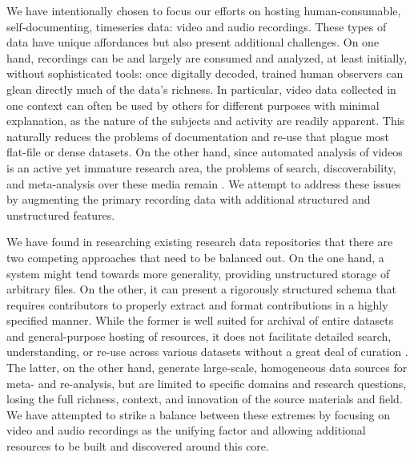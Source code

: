\documentclass{sig-alternate}
\begin{document}
We have intentionally chosen to focus our efforts on hosting human-consumable, self-documenting, timeseries data: video and audio recordings.
These types of data have unique affordances but also present additional challenges.
On one hand, recordings can be and largely are consumed and analyzed, at least initially, without sophisticated tools: once digitally decoded, trained human observers can glean directly much of the data's richness.
In particular, video data collected in one context can often be used by others for different purposes with minimal explanation, as the nature of the subjects and activity are readily apparent.
This naturally reduces the problems of documentation and re-use that plague most flat-file or dense datasets.
On the other hand, since automated analysis of videos is an active yet immature research area, the problems of search, discoverability, and meta-analysis over these media remain \cite{Albertson_2013}.
We attempt to address these issues by augmenting the primary recording data with additional structured and unstructured features.


We have found in researching existing research data repositories that there are two competing approaches that need to be balanced out.
On the one hand, a system might tend towards more generality, providing unstructured storage of arbitrary files.
On the other, it can present a rigorously structured schema that requires contributors to properly extract and format contributions in a highly specified manner.
While the former is well suited for archival of entire datasets and general-purpose hosting of resources, it does not facilitate detailed search, understanding, or re-use across various datasets without a great deal of curation \cite{Peer_2012}.
The latter, on the other hand, generate large-scale, homogeneous data sources for meta- and re-analysis, but are limited to specific domains and research questions, losing the full richness, context, and innovation of the source materials and field.
We have attempted to strike a balance between these extremes by focusing on video and audio recordings as the unifying factor and allowing additional resources to be built and discovered around this core.
\end{document}
